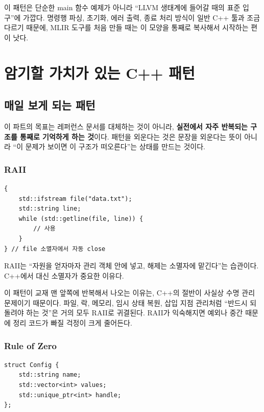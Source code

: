 \documentclass[11pt,a4paper]{book}
\DeclareRobustCommand{\code}[1]{\texttt{\detokenize{#1}}}
\newcommand{\term}[1]{\textbf{#1}}
\begin{document}
이 패턴은 단순한 main 함수 예제가 아니라 ``LLVM 생태계에 들어갈 때의 표준 입구''에 가깝다. 명령행 파싱, 초기화, 에러 출력, 종료 처리 방식이 일반 C++ 툴과 조금 다르기 때문에, MLIR 도구를 처음 만들 때는 이 모양을 통째로 복사해서 시작하는 편이 낫다.

\part{암기할 가치가 있는 C++ 패턴}

\chapter{매일 보게 되는 패턴}

이 파트의 목표는 레퍼런스 문서를 대체하는 것이 아니라, \term{실전에서 자주 반복되는 구조를 통째로 기억하게 하는 것}이다. 패턴을 외운다는 것은 문장을 외운다는 뜻이 아니라 ``이 문제가 보이면 이 구조가 떠오른다''는 상태를 만드는 것이다.

\section{RAII}

\begin{lstlisting}[style=cpp,title={자원 획득과 해제를 객체 수명에 묶기}]
{
    std::ifstream file("data.txt");
    std::string line;
    while (std::getline(file, line)) {
        // 사용
    }
} // file 소멸자에서 자동 close
\end{lstlisting}

\begin{conceptbox}[title={핵심}]
RAII는 ``자원을 얻자마자 관리 객체 안에 넣고, 해제는 소멸자에 맡긴다''는 습관이다. C++에서 \code{finally} 대신 소멸자가 중요한 이유다.
\end{conceptbox}

이 패턴이 교재 맨 앞쪽에 반복해서 나오는 이유는, C++의 절반이 사실상 수명 관리 문제이기 때문이다. 파일, 락, 메모리, 임시 상태 복원, 삽입 지점 관리처럼 ``반드시 되돌려야 하는 것''은 거의 모두 RAII로 귀결된다. RAII가 익숙해지면 예외나 중간 \code{return} 때문에 정리 코드가 빠질 걱정이 크게 줄어든다.

\section{Rule of Zero}

\begin{lstlisting}[style=cpp,title={가능하면 직접 소멸자를 쓰지 않는다}]
struct Config {
    std::string name;
    std::vector<int> values;
    std::unique_ptr<int> handle;
};
\end{lstlisting}
\end{document}
